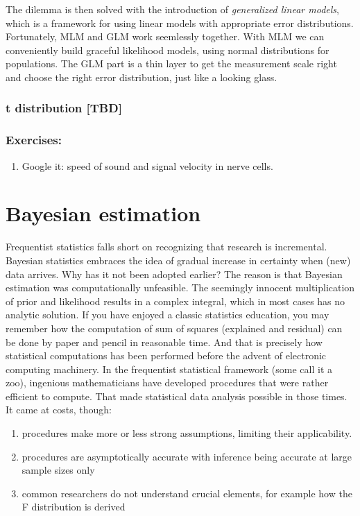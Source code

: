 \documentclass[]{svmono}
\providecommand{\tightlist}{%
  \setlength{\itemsep}{0pt}\setlength{\parskip}{0pt}}
\begin{document}
The dilemma is then solved with the introduction of \emph{generalized
linear models}, which is a framework for using linear models with
appropriate error distributions. Fortunately, MLM and GLM work
seemlessly together. With MLM we can conveniently build graceful
likelihood models, using normal distributions for populations. The GLM
part is a thin layer to get the measurement scale right and choose the
right error distribution, just like a looking glass.

\subsubsection{t distribution {[}TBD{]}}\label{t-distribution-tbd}

\subsubsection{Exercises:}\label{exercises}

\begin{enumerate}
\def\labelenumi{\arabic{enumi}.}
\tightlist
\item
  Google it: speed of sound and signal velocity in nerve cells.
\end{enumerate}

\section{Bayesian estimation}\label{bayesian-estimation}

Frequentist statistics falls short on recognizing that research is
incremental. Bayesian statistics embraces the idea of gradual increase
in certainty when (new) data arrives. Why has it not been adopted
earlier? The reason is that Bayesian estimation was computationally
unfeasible. The seemingly innocent multiplication of prior and
likelihood results in a complex integral, which in most cases has no
analytic solution. If you have enjoyed a classic statistics education,
you may remember how the computation of sum of squares (explained and
residual) can be done by paper and pencil in reasonable time. And that
is precisely how statistical computations has been performed before the
advent of electronic computing machinery. In the frequentist statistical
framework (some call it a zoo), ingenious mathematicians have developed
procedures that were rather efficient to compute. That made statistical
data analysis possible in those times. It came at costs, though:

\begin{enumerate}
\def\labelenumi{\arabic{enumi}.}
\tightlist
\item
  procedures make more or less strong assumptions, limiting their
  applicability.
\item
  procedures are asymptotically accurate with inference being accurate
  at large sample sizes only
\item
  common researchers do not understand crucial elements, for example how
  the F distribution is derived
\end{enumerate}
\end{document}
